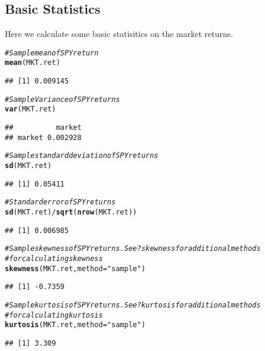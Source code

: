 \documentclass[a4paper]{article}\usepackage[]{graphicx}\usepackage[]{color}
\makeatletter
\newcommand{\hlstr}[1]{\textcolor[rgb]{0.192,0.494,0.8}{#1}}%
\newcommand{\hlcom}[1]{\textcolor[rgb]{0.678,0.584,0.686}{\textit{#1}}}%
\newcommand{\hlkwd}[1]{\textcolor[rgb]{0.737,0.353,0.396}{\textbf{#1}}}%
\newenvironment{kframe}{%
 \def\at@end@of@kframe{}%
 \ifinner\ifhmode%
  \def\at@end@of@kframe{\end{minipage}}%
  \begin{minipage}{\columnwidth}%
 \fi\fi%
 \def\FrameCommand##1{\hskip\@totalleftmargin \hskip-\fboxsep
 \colorbox{shadecolor}{##1}\hskip-\fboxsep
     \hskip-\linewidth \hskip-\@totalleftmargin \hskip\columnwidth}%
 \MakeFramed {\advance\hsize-\width
   \@totalleftmargin\z@ \linewidth\hsize
   \@setminipage}}%
 {\par\unskip\endMakeFramed%
 \at@end@of@kframe}
\newenvironment{knitrout}{}{} %
\makeatother
\begin{document}
\subsection{Basic Statistics}
Here we calculate some basic statisitics on the market returns.
\begin{knitrout}
\color{fgcolor}\begin{kframe}
\begin{alltt}
\hlcom{# Sample mean of SPY return}
\hlkwd{mean}(MKT.ret)
\end{alltt}
\begin{verbatim}
## [1] 0.009145
\end{verbatim}
\begin{alltt}

\hlcom{# Sample Variance of SPY returns}
\hlkwd{var}(MKT.ret)
\end{alltt}
\begin{verbatim}
##          market
## market 0.002928
\end{verbatim}
\begin{alltt}

\hlcom{# Sample standard deviation of SPY returns}
\hlkwd{sd}(MKT.ret)
\end{alltt}
\begin{verbatim}
## [1] 0.05411
\end{verbatim}
\begin{alltt}

\hlcom{# Standard error of SPY returns}
\hlkwd{sd}(MKT.ret)/\hlkwd{sqrt}(\hlkwd{nrow}(MKT.ret))
\end{alltt}
\begin{verbatim}
## [1] 0.006985
\end{verbatim}
\begin{alltt}

\hlcom{# Sample skewness of SPY returns.  See ?skewness for additional methods}
\hlcom{# for calculating skewness}
\hlkwd{skewness}(MKT.ret, method = \hlstr{"sample"})
\end{alltt}
\begin{verbatim}
## [1] -0.7359
\end{verbatim}
\begin{alltt}

\hlcom{# Sample kurtosis of SPY returns.  See ?kurtosis for additional methods}
\hlcom{# for calculating kurtosis}
\hlkwd{kurtosis}(MKT.ret, method = \hlstr{"sample"})
\end{alltt}
\begin{verbatim}
## [1] 3.309
\end{verbatim}
\begin{alltt}


\end{alltt}
\end{kframe}
\end{knitrout}
\end{document}
